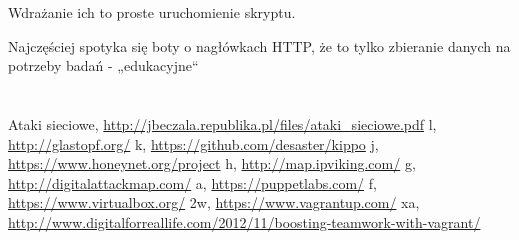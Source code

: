 \documentclass[runningheads,a4paper]{llncs}
\begin{document}
Wdrażanie ich to proste uruchomienie skryptu.

Najczęściej spotyka się boty o nagłówkach HTTP, że to tylko zbieranie danych na potrzeby badań - „edukacyjne“
\section{}
\begin{thebibliography}{1}


 Ataki sieciowe,
\url{http://jbeczala.republika.pl/files/ataki_sieciowe.pdf}
 l,
\url{http://glastopf.org/}
 k,
\url{https://github.com/desaster/kippo}
 j,
\url{https://www.honeynet.org/project}
 h,
\url{http://map.ipviking.com/}
 g,
\url{http://digitalattackmap.com/}
 a,
\url{https://puppetlabs.com/}
 f,
\url{https://www.virtualbox.org/}
 2w,
\url{https://www.vagrantup.com/}
 xa,
\url{http://www.digitalforreallife.com/2012/11/boosting-teamwork-with-vagrant/}


\end{thebibliography}
\end{document}
